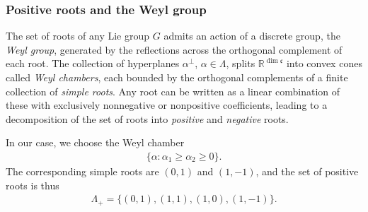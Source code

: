 \documentclass[11pt,reqno]{amsart}
\theoremstyle{remark}
\theoremstyle{definition}
\begin{document}
\subsubsection{Positive roots and the Weyl group}
The set of roots of any Lie group $G$ admits an action of a discrete group, the \emph{Weyl group}, generated by the reflections across the orthogonal complement of each root. The collection of hyperplanes $\alpha^\bot$, $\alpha \in \Lambda$, splits $\mathbb R^{\dim \mathfrak c}$ into convex cones called \emph{Weyl chambers}, each bounded by the orthogonal complements of a finite collection of \emph{simple roots}. Any root can be written as a linear combination of these with exclusively nonnegative or nonpositive coefficients, leading to a decomposition of the set of roots into \emph{positive} and \emph{negative} roots.

In our case, we choose the Weyl chamber
\begin{align*}
    \{\alpha: \alpha_1 \geq \alpha_2 \geq 0\}.
\end{align*}
The corresponding simple roots are $(0,1)$ and $(1,-1)$, and the set of positive roots is thus
\begin{align*}
    \Lambda_+ = \{(0,1),(1,1),(1,0),(1,-1)\}.
\end{align*}
\end{document}
